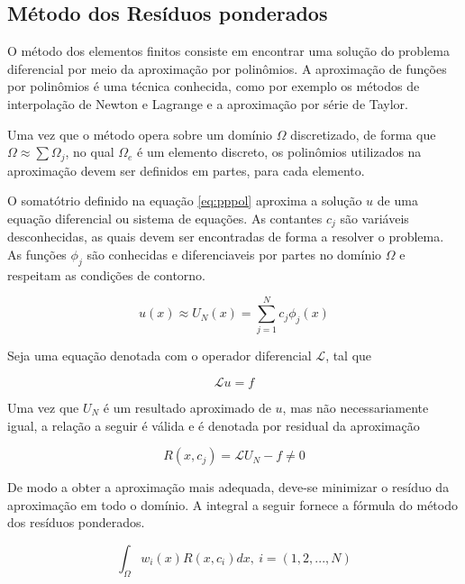 \subsection{Método dos Resíduos ponderados}

O método dos elementos finitos consiste em encontrar uma  solução do problema diferencial por meio da aproximação por polinômios. 
\citep[p. 97]{davis}
A aproximação de funções por polinômios é uma técnica conhecida, como por exemplo os métodos de interpolação de Newton e Lagrange e a aproximação por série de Taylor. 

Uma vez que o método opera sobre um domínio $ \Omega $ discretizado, de forma que $ \Omega \approx \sum \Omega_j $, no qual $ \Omega_e $ é um elemento discreto, os polinômios utilizados na aproximação devem ser definidos em partes, para cada elemento.

O somatótrio definido na equação \ref{eq:pppol} aproxima a solução $ u $ de uma equação diferencial ou sistema de equações. As contantes $ c_j $ são variáveis desconhecidas, as quais devem ser encontradas de forma a resolver o problema. As funções $ \phi_j $ são conhecidas e diferenciaveis por partes no domínio $ \Omega $ e respeitam as condições de contorno.
 

\begin{equation}
	\label{eq:pppol}
	u(x) \approx U_N (x) = \sum_{j = 1}^{N} c_j \phi_j (x)
\end{equation}

 Seja uma equação denotada com o operador diferencial $ \mathcal{L} $, tal que
 
 \begin{equation}
 	\mathcal{L} u = f
 \end{equation}
 
 Uma vez que $U_N$ é um resultado aproximado de $u$, mas não necessariamente igual, a relação a seguir é válida e é denotada por residual da aproximação
 
 \begin{equation}
 	R(x, c_j) = \mathcal{L} U_N - f \neq 0
 \end{equation}
 
 De modo a obter a aproximação mais adequada, deve-se minimizar o resíduo da aproximação em todo o domínio. A integral a seguir fornece a fórmula do método dos resíduos ponderados.
 
 \begin{equation}
	\int_{\Omega} w_i(x)R(x, c_i)dx, \ i = (1, 2, ..., N)
 \end{equation} 
 
